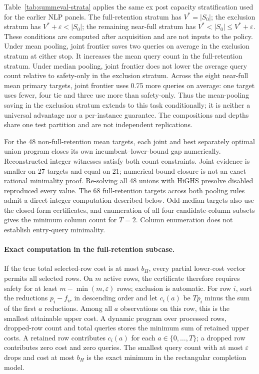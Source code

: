 Table~\ref{tab:summeval-strata} applies the same ex post capacity stratification used for the earlier NLP panels. The full-retention stratum has $V^*=|S_0|$; the exclusion stratum has $V^*+\varepsilon<|S_0|$; the remaining near-full stratum has $V^*<|S_0|\le V^*+\varepsilon$. These conditions are computed after acquisition and are not inputs to the policy. Under mean pooling, joint frontier saves two queries on average in the exclusion stratum at either stop. It increases the mean query count in the full-retention stratum. Under median pooling, joint frontier does not lower the average query count relative to safety-only in the exclusion stratum. Across the eight near-full mean primary targets, joint frontier uses 0.75 more queries on average: one target uses fewer, four tie and three use more than safety-only. Thus the mean-pooling saving in the exclusion stratum extends to this task conditionally; it is neither a universal advantage nor a per-instance guarantee. The compositions and depths share one test partition and are not independent replications.


For the 48 non-full-retention mean targets, each joint and best separately optimal union program closes its own incumbent--lower-bound gap numerically. Reconstructed integer witnesses satisfy both count constraints. Joint evidence is smaller on 27 targets and equal on 21; numerical bound closure is not an exact rational minimality proof. Re-solving all 48 unions with HiGHS presolve disabled reproduced every value. The 68 full-retention targets across both pooling rules admit a direct integer computation described below. Odd-median targets also use the closed-form certificates, and enumeration of all four candidate-column subsets gives the minimum column count for $T=2$. Column enumeration does not establish entry-query minimality.

\paragraph{Exact computation in the full-retention subcase.}
If the true total selected-row cost is at most $b_H$, every partial lower-cost vector permits all selected rows. On $m$ active rows, the certificate therefore requires safety for at least $m-\min(m,\varepsilon)$ rows; exclusion is automatic. For row $i$, sort the reductions $p_i-f_{ir}$ in descending order and let $c_i(a)$ be $Tp_i$ minus the sum of the first $a$ reductions. Among all $a$ observations on this row, this is the smallest attainable upper cost. A dynamic program over processed rows, dropped-row count and total queries stores the minimum sum of retained upper costs. A retained row contributes $c_i(a)$ for each $a\in\{0,\ldots,T\}$; a dropped row contributes zero cost and zero queries. The smallest query count with at most $\varepsilon$ drops and cost at most $b_H$ is the exact minimum in the rectangular completion model.

